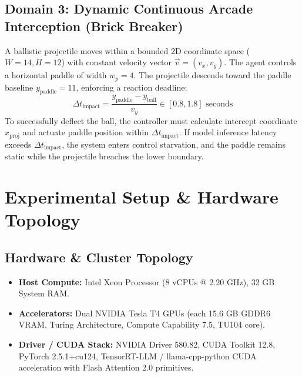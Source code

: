 \documentclass[journal,compsoc]{IEEEtran}
\begin{document}
\subsection{Domain 3: Dynamic Continuous Arcade Interception (Brick Breaker)}
A ballistic projectile moves within a bounded 2D coordinate space ($W = 14, H = 12$) with constant velocity vector $\vec{v} = (v_x, v_y)$. The agent controls a horizontal paddle of width $w_p = 4$.
The projectile descends toward the paddle baseline $y_{\text{paddle}} = 11$, enforcing a reaction deadline:
\begin{equation}
\Delta t_{\text{impact}} = \frac{y_{\text{paddle}} - y_{\text{ball}}}{v_y} \in [0.8, 1.8] \text{ seconds}
\end{equation}
To successfully deflect the ball, the controller must calculate intercept coordinate $x_{\text{proj}}$ and actuate paddle position within $\Delta t_{\text{impact}}$. If model inference latency exceeds $\Delta t_{\text{impact}}$, the system enters control starvation, and the paddle remains static while the projectile breaches the lower boundary.

\section{Experimental Setup \& Hardware Topology}

\subsection{Hardware \& Cluster Topology}
\begin{itemize}
    \item \textbf{Host Compute:} Intel Xeon Processor (8 vCPUs @ 2.20 GHz), 32 GB System RAM.
    \item \textbf{Accelerators:} Dual NVIDIA Tesla T4 GPUs (each 15.6 GB GDDR6 VRAM, Turing Architecture, Compute Capability 7.5, TU104 core).
    \item \textbf{Driver / CUDA Stack:} NVIDIA Driver 580.82, CUDA Toolkit 12.8, PyTorch 2.5.1+cu124, TensorRT-LLM / llama-cpp-python CUDA acceleration with Flash Attention 2.0 primitives.
\end{itemize}
\end{document}
